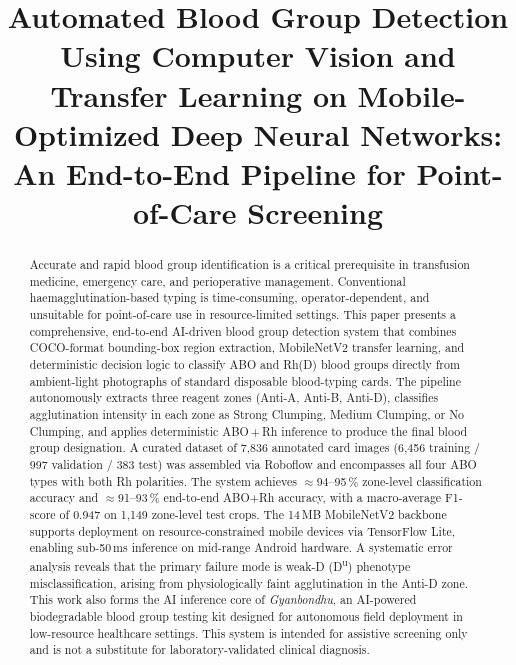 \documentclass[journal]{IEEEtran}
\begin{document}
\title{Automated Blood Group Detection Using Computer Vision and
       Transfer Learning on Mobile-Optimized Deep Neural Networks:
       An End-to-End Pipeline for Point-of-Care Screening}

\author{
}

\maketitle

\begin{abstract}
Accurate and rapid blood group identification is a critical
prerequisite in transfusion medicine, emergency care, and
perioperative management.
Conventional haemagglutination-based typing is time-consuming,
operator-dependent, and unsuitable for point-of-care use in
resource-limited settings.
This paper presents a comprehensive, end-to-end AI-driven blood
group detection system that combines COCO-format bounding-box
region extraction, MobileNetV2 transfer learning, and deterministic
decision logic to classify ABO and Rh(D) blood groups directly from
ambient-light photographs of standard disposable blood-typing cards.
The pipeline autonomously extracts three reagent zones (Anti-A,
Anti-B, Anti-D), classifies agglutination intensity in each zone
as Strong Clumping, Medium Clumping, or No Clumping, and applies
deterministic ABO\,+\,Rh inference to produce the final blood group
designation.
A curated dataset of 7,836 annotated card images (6,456 training /
997 validation / 383 test) was assembled via Roboflow and
encompasses all four ABO types with both Rh polarities.
The system achieves $\approx$94--95\,\% zone-level classification
accuracy and $\approx$91--93\,\% end-to-end ABO+Rh accuracy, with
a macro-average F1-score of 0.947 on 1,149 zone-level test crops.
The 14\,MB MobileNetV2 backbone supports deployment on
resource-constrained mobile devices via TensorFlow Lite, enabling
sub-50\,ms inference on mid-range Android hardware.
A systematic error analysis reveals that the primary failure mode
is weak-D (D\textsuperscript{u}) phenotype misclassification,
arising from physiologically faint agglutination in the Anti-D zone.
This work also forms the AI inference core of \emph{Gyanbondhu}, an
AI-powered biodegradable blood group testing kit designed for
autonomous field deployment in low-resource healthcare settings.
This system is intended for assistive screening only and is not
a substitute for laboratory-validated clinical diagnosis.
\end{abstract}
\end{document}
